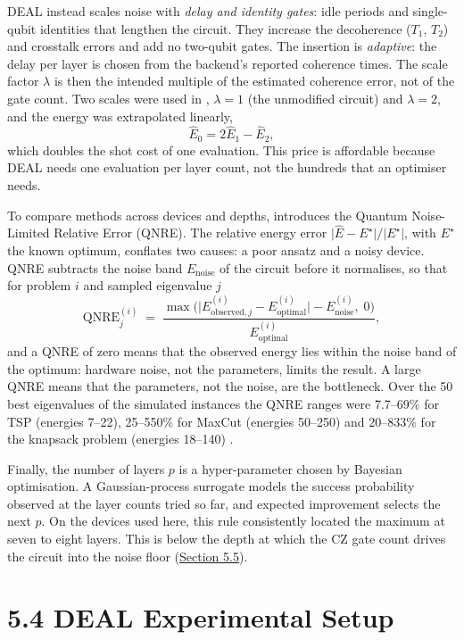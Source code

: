 \documentclass{report}
\theoremstyle{plain}
\theoremstyle{definition}
\theoremstyle{remark}
\begin{document}
DEAL instead scales noise with \emph{delay and identity gates}: idle periods and single-qubit identities that lengthen the circuit. They increase the decoherence ($T_{1}$, $T_{2}$) and crosstalk errors and add no two-qubit gates. The insertion is \emph{adaptive}: the delay per layer is chosen from the backend's reported coherence times. The scale factor $\lambda$ is then the intended multiple of the estimated coherence error, not of the gate count. Two scales were used in \cite{guo2025deal}, $\lambda=1$ (the unmodified circuit) and $\lambda=2$, and the energy was extrapolated linearly,
\hypertarget{eq:nisq:zne}{}\[
  \hat{E}_{0} = 2\hat{E}_{1} - \hat{E}_{2},
\tag{5.9}\]
which doubles the shot cost of one evaluation. This price is affordable because DEAL needs one evaluation per layer count, not the hundreds that an optimiser needs.

To compare methods across devices and depths, \cite{guo2025deal} introduces the Quantum Noise-Limited Relative Error (QNRE). The relative energy error $\lvert\hat{E}-E^{\star}\rvert/\lvert E^{\star}\rvert$, with $E^{\star}$ the known optimum, conflates two causes: a poor ansatz and a noisy device. QNRE subtracts the noise band $E_{\mathrm{noise}}$ of the circuit before it normalises, so that for problem $i$ and sampled eigenvalue $j$
\hypertarget{eq:nisq:qnre}{}\[
  \mathrm{QNRE}^{(i)}_{j} \;=\; \frac{\max\big(\lvert E^{(i)}_{\mathrm{observed},j}-E^{(i)}_{\mathrm{optimal}}\rvert - E^{(i)}_{\mathrm{noise}},\;0\big)}{E^{(i)}_{\mathrm{optimal}}},
\tag{5.10}\]
and a QNRE of zero means that the observed energy lies within the noise band of the optimum: hardware noise, not the parameters, limits the result. A large QNRE means that the parameters, not the noise, are the bottleneck. Over the 50 best eigenvalues of the simulated instances the QNRE ranges were 7.7--69\% for TSP (energies 7--22), 25--550\% for MaxCut (energies 50--250) and 20--833\% for the knapsack problem (energies 18--140) \cite{guo2025deal}.

Finally, the number of layers $p$ is a hyper-parameter chosen by Bayesian optimisation. A Gaussian-process surrogate models the success probability observed at the layer counts tried so far, and expected improvement selects the next $p$. On the devices used here, this rule consistently located the maximum at seven to eight layers. This is below the depth at which the CZ gate count drives the circuit into the noise floor (\hyperref[sec:nisq:deal-results]{Section 5.5}).

\section{5.4 DEAL Experimental Setup}\label{sec:nisq:deal-setup}
\end{document}
